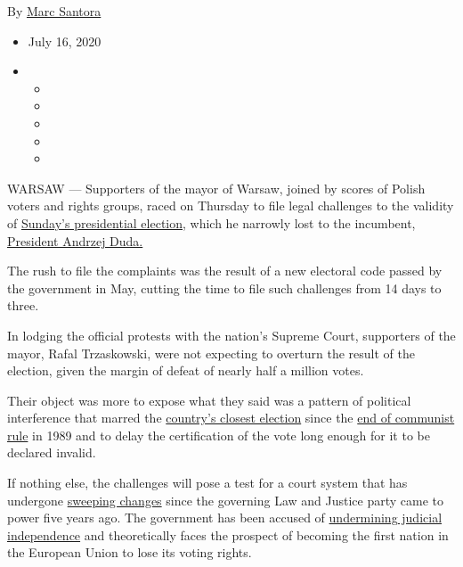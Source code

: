 By \href{https://www.nytimes.com/by/marc-santora}{Marc Santora}

\begin{itemize}
\item
  July 16, 2020
\item
  \begin{itemize}
  \item
  \item
  \item
  \item
  \item
  \end{itemize}
\end{itemize}

WARSAW --- Supporters of the mayor of Warsaw, joined by scores of Polish
voters and rights groups, raced on Thursday to file legal challenges to
the validity of
\href{https://www.nytimes.com/2020/07/13/world/europe/poland-president-elections-Andrzej-Duda.html}{Sunday's
presidential election}, which he narrowly lost to the incumbent,
\href{https://www.nytimes.com/2020/06/24/us/politics/trump-andrzej-duda-poland.html}{President
Andrzej Duda.}

The rush to file the complaints was the result of a new electoral code
passed by the government in May, cutting the time to file such
challenges from 14 days to three.

In lodging the official protests with the nation's Supreme Court,
supporters of the mayor, Rafal Trzaskowski, were not expecting to
overturn the result of the election, given the margin of defeat of
nearly half a million votes.

Their object was more to expose what they said was a pattern of
political interference that marred the
\href{https://www.nytimes.com/2020/07/14/world/europe/poland-election-court-challenge.html}{country's
closest election} since the
\href{https://www.nytimes.com/1989/08/20/weekinreview/a-new-orbit-poland-s-break-leads-europe-and-communism-to-a-threshold.html}{end
of communist rule} in 1989 and to delay the certification of the vote
long enough for it to be declared invalid.

If nothing else, the challenges will pose a test for a court system that
has undergone
\href{https://www.nytimes.com/2017/12/20/world/europe/eu-poland-law.html}{sweeping
changes} since the governing Law and Justice party came to power five
years ago. The government has been accused of
\href{https://www.nytimes.com/2018/07/03/world/europe/poland-supreme-court-protest.html}{undermining
judicial independence} and theoretically faces the prospect of becoming
the first nation in the European Union to lose its voting rights.


